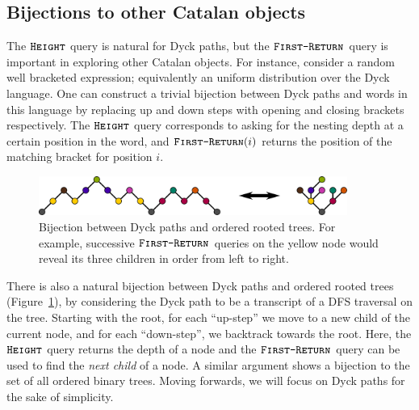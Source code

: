 \subsection{Bijections to other Catalan objects}%
The $\texttt{\textsc{Height}}$ query is natural for Dyck paths, but the $\texttt{\textsc{First-Return}}$ query is important in exploring other Catalan objects.
For instance, consider a random well bracketed expression; equivalently an uniform distribution over the Dyck language.
One can construct a trivial bijection between Dyck paths and words in this language
by replacing up and down steps with opening and closing brackets respectively.
The $\texttt{\textsc{Height}}$ query corresponds to asking for the nesting depth at a certain position in the word,
and $\texttt{\textsc{First-Return}}(i)$ returns the position of the matching bracket for position $i$.

\label{sec:bijections_to_other_catalan_objects}
\begin{figure}[htbp]
    \centering
    \includegraphics[width=0.9\textwidth]{images/dyck_tree_bijection.pdf}
    \caption{Bijection between Dyck paths and ordered rooted trees.
    For example, successive $\texttt{\textsc{First-Return}}$ queries on the yellow node would reveal its three children in order from left to right.}
    \label{fig:dyck_tree_bijection}
\end{figure}
There is also a natural bijection between Dyck paths and ordered rooted trees (Figure~\ref{fig:dyck_tree_bijection}),
by considering the Dyck path to be a transcript of a DFS traversal on the tree.
Starting with the root, for each ``up-step'' we move to a new child of the current node, and for each ``down-step'', we backtrack towards the root.
Here, the $\texttt{\textsc{Height}}$ query returns the depth of a node and the $\texttt{\textsc{First-Return}}$ query can be used to find the \emph{next child} of a node.
A similar argument shows a bijection to the set of all ordered binary trees.
Moving forwards, we will focus on Dyck paths for the sake of simplicity.



